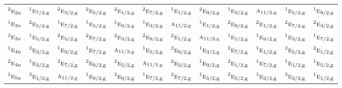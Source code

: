 \documentclass[10pt,a4paper]{article}
\numberwithin{equation}{section}
\newcommand{\irr}[1]{\text{\normalfont\scshape #1}}
\newcommand{\conjpair}[1]{{}^{#1}}
\newcommand{\ptag}[1]{\mathrm{#1}}
\begin{document}
{\begin{longtable}{@{}lccccccccccc@{}}
$\conjpair{2}\irr{e}_{2\ptag{u}}$ & $\conjpair{1}\irr{e}_{7/2,\ptag{g}}$ & $\conjpair{2}\irr{e}_{3/2,\ptag{g}}$ & $\conjpair{2}\irr{e}_{5/2,\ptag{g}}$ & $\conjpair{2}\irr{e}_{1/2,\ptag{g}}$ & $\conjpair{2}\irr{e}_{7/2,\ptag{g}}$ & $\conjpair{1}\irr{e}_{1/2,\ptag{g}}$ & $\conjpair{2}\irr{e}_{9/2,\ptag{g}}$ & $\conjpair{1}\irr{e}_{3/2,\ptag{g}}$ & $\irr{a}_{11/2,\ptag{g}}$ & $\conjpair{1}\irr{e}_{5/2,\ptag{g}}$ & $\conjpair{1}\irr{e}_{9/2,\ptag{g}}$\\
$\conjpair{1}\irr{e}_{3\ptag{u}}$ & $\conjpair{2}\irr{e}_{5/2,\ptag{g}}$ & $\conjpair{1}\irr{e}_{7/2,\ptag{g}}$ & $\conjpair{1}\irr{e}_{5/2,\ptag{g}}$ & $\conjpair{1}\irr{e}_{9/2,\ptag{g}}$ & $\conjpair{1}\irr{e}_{3/2,\ptag{g}}$ & $\irr{a}_{11/2,\ptag{g}}$ & $\conjpair{1}\irr{e}_{1/2,\ptag{g}}$ & $\conjpair{2}\irr{e}_{9/2,\ptag{g}}$ & $\conjpair{2}\irr{e}_{1/2,\ptag{g}}$ & $\conjpair{2}\irr{e}_{7/2,\ptag{g}}$ & $\conjpair{2}\irr{e}_{3/2,\ptag{g}}$\\
$\conjpair{2}\irr{e}_{3\ptag{u}}$ & $\conjpair{1}\irr{e}_{5/2,\ptag{g}}$ & $\conjpair{2}\irr{e}_{5/2,\ptag{g}}$ & $\conjpair{2}\irr{e}_{7/2,\ptag{g}}$ & $\conjpair{2}\irr{e}_{3/2,\ptag{g}}$ & $\conjpair{2}\irr{e}_{9/2,\ptag{g}}$ & $\conjpair{2}\irr{e}_{1/2,\ptag{g}}$ & $\irr{a}_{11/2,\ptag{g}}$ & $\conjpair{1}\irr{e}_{1/2,\ptag{g}}$ & $\conjpair{1}\irr{e}_{9/2,\ptag{g}}$ & $\conjpair{1}\irr{e}_{3/2,\ptag{g}}$ & $\conjpair{1}\irr{e}_{7/2,\ptag{g}}$\\
$\conjpair{1}\irr{e}_{4\ptag{u}}$ & $\conjpair{2}\irr{e}_{3/2,\ptag{g}}$ & $\conjpair{1}\irr{e}_{9/2,\ptag{g}}$ & $\conjpair{1}\irr{e}_{7/2,\ptag{g}}$ & $\irr{a}_{11/2,\ptag{g}}$ & $\conjpair{1}\irr{e}_{5/2,\ptag{g}}$ & $\conjpair{2}\irr{e}_{9/2,\ptag{g}}$ & $\conjpair{1}\irr{e}_{3/2,\ptag{g}}$ & $\conjpair{2}\irr{e}_{7/2,\ptag{g}}$ & $\conjpair{1}\irr{e}_{1/2,\ptag{g}}$ & $\conjpair{2}\irr{e}_{5/2,\ptag{g}}$ & $\conjpair{2}\irr{e}_{1/2,\ptag{g}}$\\
$\conjpair{2}\irr{e}_{4\ptag{u}}$ & $\conjpair{1}\irr{e}_{3/2,\ptag{g}}$ & $\conjpair{2}\irr{e}_{7/2,\ptag{g}}$ & $\conjpair{2}\irr{e}_{9/2,\ptag{g}}$ & $\conjpair{2}\irr{e}_{5/2,\ptag{g}}$ & $\irr{a}_{11/2,\ptag{g}}$ & $\conjpair{2}\irr{e}_{3/2,\ptag{g}}$ & $\conjpair{1}\irr{e}_{9/2,\ptag{g}}$ & $\conjpair{2}\irr{e}_{1/2,\ptag{g}}$ & $\conjpair{1}\irr{e}_{7/2,\ptag{g}}$ & $\conjpair{1}\irr{e}_{1/2,\ptag{g}}$ & $\conjpair{1}\irr{e}_{5/2,\ptag{g}}$\\
$\conjpair{1}\irr{e}_{5\ptag{u}}$ & $\conjpair{2}\irr{e}_{1/2,\ptag{g}}$ & $\irr{a}_{11/2,\ptag{g}}$ & $\conjpair{1}\irr{e}_{9/2,\ptag{g}}$ & $\conjpair{2}\irr{e}_{9/2,\ptag{g}}$ & $\conjpair{1}\irr{e}_{7/2,\ptag{g}}$ & $\conjpair{2}\irr{e}_{7/2,\ptag{g}}$ & $\conjpair{1}\irr{e}_{5/2,\ptag{g}}$ & $\conjpair{2}\irr{e}_{5/2,\ptag{g}}$ & $\conjpair{1}\irr{e}_{3/2,\ptag{g}}$ & $\conjpair{2}\irr{e}_{3/2,\ptag{g}}$ & $\conjpair{1}\irr{e}_{1/2,\ptag{g}}$\\

\end{longtable}}
\end{document}
